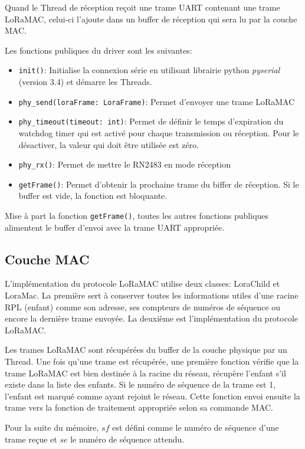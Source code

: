     Quand le Thread de réception reçoit une trame UART contenant une trame LoRaMAC, celui-ci l'ajoute dans un buffer de réception qui sera lu par la couche MAC.

    Les fonctions publiques du driver sont les suivantes:
    \begin{itemize}
        \item \texttt{init()}: Initialise la connexion série en utilisant librairie python \textit{pyserial} (version 3.4) et démarre les Threads.
        \item \texttt{phy\_send(loraFrame: LoraFrame)}: Permet d'envoyer une trame LoRaMAC
        \item \texttt{phy\_timeout(timeout: int)}: Permet de définir le temps d'expiration du watchdog timer qui est activé pour chaque transmission ou réception. Pour le désactiver, la valeur qui doit être utilisée est zéro.
        \item \texttt{phy\_rx()}: Permet de mettre le RN2483 en mode réception
        \item \texttt{getFrame()}: Permet d'obtenir la prochaine trame du biffer de réception. Si le buffer est vide, la fonction est bloquante.
    \end{itemize}

    Mise à part la fonction \texttt{getFrame()}, toutes les autres fonctions publiques alimentent le buffer d'envoi avec la trame UART appropriée.

\subsection*{Couche MAC}
    L'implémentation du protocole LoRaMAC utilise deux classes: LoraChild et LoraMac. La première sert à conserver toutes les informations utiles d'une racine RPL (enfant) comme son adresse, ses compteurs de numéros de séquence ou encore la dernière trame envoyée.
    La deuxième est l'implémentation du protocole LoRaMAC.%

    Les trames LoRaMAC sont récupérées du buffer de la couche physique par un Thread. Une fois qu'une trame est récupérée, une première fonction vérifie que la trame LoRaMAC est bien destinée à la racine du réseau, récupère l'enfant s'il existe dans la liste des enfants. Si le numéro de séquence de la trame est 1, l'enfant est marqué comme ayant rejoint le réseau. Cette fonction envoi ensuite la trame vers la fonction de traitement appropriée selon sa commande MAC.

    Pour la suite du mémoire, $sf$ est défini comme le numéro de séquence d'une trame reçue et $se$ le numéro de séquence attendu.

